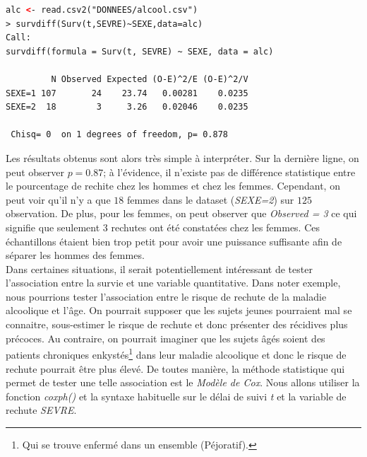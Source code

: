 \begin{lstlisting}[language=html]
alc <- read.csv2("DONNEES/alcool.csv")
> survdiff(Surv(t,SEVRE)~SEXE,data=alc)
Call:
survdiff(formula = Surv(t, SEVRE) ~ SEXE, data = alc)

         N Observed Expected (O-E)^2/E (O-E)^2/V
SEXE=1 107       24    23.74   0.00281    0.0235
SEXE=2  18        3     3.26   0.02046    0.0235

 Chisq= 0  on 1 degrees of freedom, p= 0.878 
\end{lstlisting}
Les résultats obtenus sont alors très simple à interpréter. Sur la dernière ligne, on peut observer $p=0.87$; à l'évidence, il n'existe pas de différence statistique entre le pourcentage de rechite chez les hommes et chez les femmes. Cependant, on peut voir qu'il n'y a que $18$ femmes dans le dataset (\textit{SEXE=2}) sur $125$ observation. De plus, pour les femmes, on peut observer que \textit{Observed = 3} ce qui signifie que seulement $3$ rechutes ont été constatées chez les femmes.\newline
Ces échantillons étaient bien trop petit pour avoir une puissance suffisante afin de séparer les hommes des femmes.\newline
\\
Dans certaines situations, il serait potentiellement intéressant de tester l'association entre la survie et une variable quantitative. Dans noter exemple, nous pourrions tester l'association entre le risque de rechute de la maladie alcoolique et l'âge. On pourrait supposer que les sujets jeunes pourraient mal se connaitre, sous-estimer le risque de rechute et donc présenter des récidives plus précoces.\newline
Au contraire, on pourrait imaginer que les sujets âgés soient des patients chroniques enkystés\footnote{Qui se trouve enfermé dans un ensemble (Péjoratif). } dans leur maladie alcoolique et donc le risque de rechute pourrait être plus élevé.\newline
De toutes manière, la méthode statistique qui permet de tester une telle association est le \textit{Modèle de Cox}.\newline
Nous allons utiliser la fonction \textit{coxph()} et la syntaxe habituelle sur le délai de suivi \textit{t} et la variable de rechute \textit{SEVRE}.

